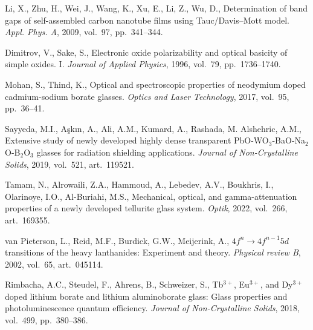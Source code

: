\documentclass[press]{vestnik}
\begin{document}
\begin{thebibliography}{22}
Li, X., Zhu, H., Wei, J., Wang, K., Xu, E., Li, Z., Wu, D., 
Determination of band gaps of self-assembled carbon nanotube films using 
Tauc/Davis--Mott model. \emph{Appl. Phys. A}, 2009, vol.~97, pp.~341--344. 

Dimitrov, V., Sake, S., Electronic oxide polarizability and optical 
basicity of simple oxides. I. \emph{Journal of Applied Physics}, 1996, vol.~79, pp.~1736--1740. 

Mohan, S., Thind, K., Optical and spectroscopic properties of neodymium 
doped cadmium-sodium borate glasses. \emph{Optics and Laser Technology}, 2017, vol.~95, pp.~36--41. 

Sayyeda, M.I., Aşkın, A., Ali, A.M., Kumard, A., Rashada, M. Alshehric, A.M., Extensive study of newly developed highly dense transparent 
PbO-WO$_{3}$-BaO-Na$_{2}$O-B$_{2}$O$_{3}$ glasses for radiation shielding 
applications. \emph{Journal of Non-Crystalline Solids}, 2019, vol.~521, art.~119521. 

Tamam, N., Alrowaili, Z.A., Hammoud, A., Lebedev, A.V., Boukhris, I., 
Olarinoye, I.O., Al-Buriahi, M.S., Mechanical, optical, and gamma-attenuation 
properties of a newly developed tellurite glass system. \emph{Optik}, 2022, vol.~266, art.~169355. 

van Pieterson, L., Reid, M.F., Burdick, G.W., Meijerink, A., 
$4f^{n}\to 4f^{n-1} 5d$ transitions of the heavy lanthanides: Experiment and 
theory. \emph{Physical review B}, 2002, vol.~65, art.~045114. 

Rimbacha, A.C., Steudel, F., Ahrens, B., Schweizer, S., Tb$^{3+}$, Eu$^{3+}$, and Dy$^{3+}$ doped lithium borate and lithium aluminoborate 
glass: Glass properties and photoluminescence quantum efficiency. \emph{Journal of 
Non-Crystalline Solids}, 2018, vol.~499, pp.~380--386. 
\end{thebibliography}
\end{document}
